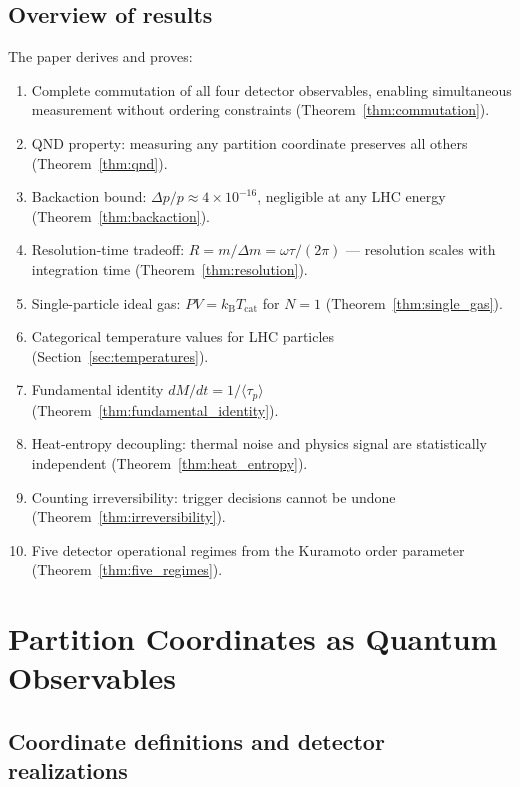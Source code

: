 \documentclass[twocolumn,10pt,a4paper]{article}
\theoremstyle{thmstyle}
\theoremstyle{definition}
\theoremstyle{remark}
\newcommand{\kB}{k_{\mathrm{B}}}
\begin{document}
\subsection{Overview of results}

The paper derives and proves:

\begin{enumerate}[nosep,label=(\arabic*)]
\item Complete commutation of all four detector observables, enabling
simultaneous measurement without ordering constraints
(Theorem~\ref{thm:commutation}).
\item QND property: measuring any partition coordinate preserves all others
(Theorem~\ref{thm:qnd}).
\item Backaction bound: $\Delta p/p \approx 4 \times 10^{-16}$,
negligible at any LHC energy (Theorem~\ref{thm:backaction}).
\item Resolution-time tradeoff: $R = m/\Delta m = \omega\tau/(2\pi)$
— resolution scales with integration time (Theorem~\ref{thm:resolution}).
\item Single-particle ideal gas: $PV = \kB T_{\mathrm{cat}}$ for $N = 1$
(Theorem~\ref{thm:single_gas}).
\item Categorical temperature values for LHC particles (Section~\ref{sec:temperatures}).
\item Fundamental identity $dM/dt = 1/\langle\tau_p\rangle$
(Theorem~\ref{thm:fundamental_identity}).
\item Heat-entropy decoupling: thermal noise and physics signal are
statistically independent (Theorem~\ref{thm:heat_entropy}).
\item Counting irreversibility: trigger decisions cannot be undone
(Theorem~\ref{thm:irreversibility}).
\item Five detector operational regimes from the Kuramoto order parameter
(Theorem~\ref{thm:five_regimes}).
\end{enumerate}

\section{Partition Coordinates as Quantum Observables}
\label{sec:coordinates}

\subsection{Coordinate definitions and detector realizations}
\end{document}
